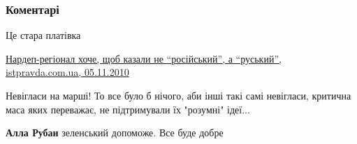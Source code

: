  
 
 
 
 
\subsubsection{Коментарі}
\label{sec:12_08_2021.fb.nicoj_larisa.1.rossia_slovo_moskovia.cmt}

\begin{itemize}
 

Це стара платівка

\href{https://www.istpravda.com.ua/short/4cd425315d176/}{%
Нардеп-регіонал хоче, щоб казали не \enquote{російський}, а \enquote{руський}, istpravda.com.ua, 05.11.2010%
}

 

Невігласи на марші! То все було б нічого, аби інші такі самі невігласи,
критична маса яких переважає, не підтримували їх "розумні" ідеї... 🙁

\begin{itemize}
 
\textbf{Алла Рубан} зеленський допоможе. Все буде добре

\begin{itemize}
 

\end{itemize}
\end{itemize}
\end{itemize}

